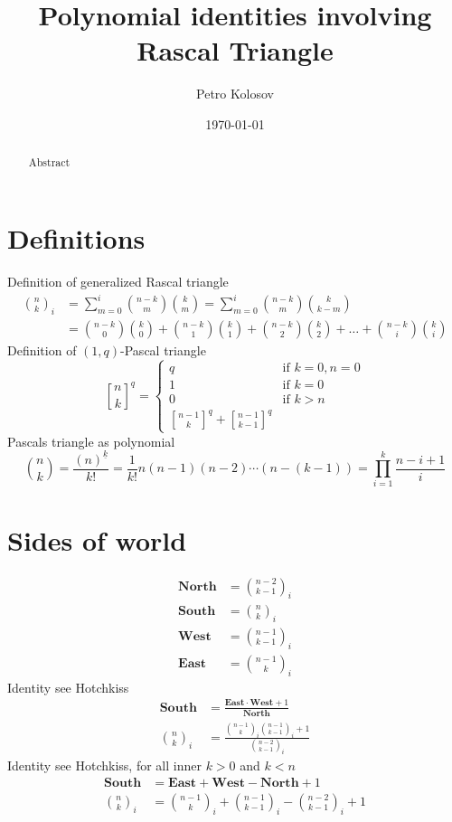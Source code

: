 \documentclass[12pt,letterpaper,oneside,reqno]{amsart}
\title[Polynomial identities involving Rascal Triangle]
{Polynomial identities involving Rascal Triangle}
\author[Petro Kolosov]{Petro Kolosov}
\date{\today}
\newcommand \fallingFactorial [2] {\left(#1 \right)^{\underline{#2}}}
\newcommand \rascalNumber [3] {\binom{#1}{#2}_{#3}}
\newcommand \north[0] {\mathbf{North}}
\newcommand \south[0] {\mathbf{South}}
\newcommand \west[0] {\mathbf{West}}
\newcommand \east[0] {\mathbf{East}}
\newcommand{\genstirlingI}[3]{%
    \genfrac{[}{]}{0pt}{#1}{#2}{#3}%
}
\newcommand{\oneQBinomial}[3]{\genstirlingI{}{#1}{#2}^{#3}}
\numberwithin{equation}{section}
\begin{document}
\begin{abstract}
    Abstract
\end{abstract}

\maketitle


\section{Definitions}
Definition of generalized Rascal triangle
\begin{align}
    \rascalNumber{n}{k}{i} &= \sum_{m=0}^{i} \binom{n-k}{m} \binom{k}{m} = \sum_{m=0}^{i} \binom{n-k}{m} \binom{k}{k-m} \\
    &= \binom{n-k}{0} \binom{k}{0} + \binom{n-k}{1} \binom{k}{1} + \binom{n-k}{2} \binom{k}{2} + \ldots + \binom{n-k}{i} \binom{k}{i}
\end{align}
Definition of $(1, q)$-Pascal triangle
\begin{equation*}
    \oneQBinomial{n}{k}{q} =
    \begin{cases}
        q & \text{if } k=0, n=0 \\
        1 & \text{if } k=0 \\
        0 & \text{if } k > n \\
        \oneQBinomial{n-1}{k}{q} + \oneQBinomial{n-1}{k-1}{q}
    \end{cases}
\end{equation*}
Pascals triangle as polynomial
\begin{equation}
    \binom{n}{k}= \frac{\fallingFactorial{n}{k}}{k!}= \frac{1}{k!} n(n-1)(n-2)\cdots (n-(k-1)) = \prod_{i=1}^{k} \frac{n-i+1}{i}
\end{equation}


\section{Sides of world}
\begin{align*}
    \north &= \rascalNumber{n-2}{k-1}{i} \\
    \south &= \rascalNumber{n}{k}{i} \\
    \west  &= \rascalNumber{n-1}{k-1}{i} \\
    \east  &= \rascalNumber{n-1}{k}{i}
\end{align*}
Identity see Hotchkiss
\begin{align}
    \south                  &= \frac{\east \cdot \west + 1}{\north} \\
    \rascalNumber{n}{k}{i}  &= \frac{\rascalNumber{n-1}{k}{i} \rascalNumber{n-1}{k-1}{i} +1}{\rascalNumber{n-2}{k-1}{i}}
\end{align}
Identity see Hotchkiss, for all inner $k > 0$ and $k < n$
\begin{align}
    \south                 &= \east + \west - \north  + 1 \\
    \rascalNumber{n}{k}{i} &= \rascalNumber{n-1}{k}{i} + \rascalNumber{n-1}{k-1}{i} - \rascalNumber{n-2}{k-1}{i} + 1
\end{align}
\end{document}
